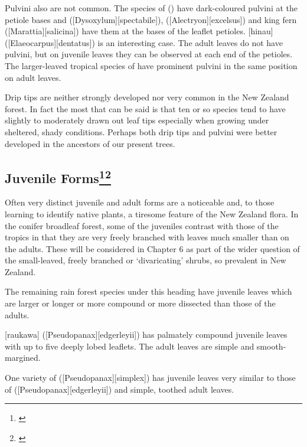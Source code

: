 Pulvini also are not common.
The species of  () have dark-coloured pulvini at the petiole bases and  ([Dysoxylum][spectabile]),  ([Alectryon][excelsus]) and king fern ([Marattia][salicina]) have them at the bases of the leaflet petioles.
[hinau] ([Elaeocarpus][dentatus]) is an interesting case.
The adult leaves do not have pulvini, but on juvenile leaves they can be observed at each end of the petioles.
The larger-leaved tropical species of  have prominent pulvini in the same position on adult leaves.

Drip tips are neither strongly developed nor very common in the New Zealand forest.
In fact the most that can be said is that ten or so species tend to have slightly to moderately drawn out leaf tips especially when growing under sheltered, shady conditions.
Perhaps both drip tips and pulvini were better developed in the ancestors of our present trees.

\subsection[Juvenile Forms]{Juvenile Forms\thinspace\footnote{\cite{godley1985paths}}\footnote{\cite{philipson1964habit}}}

Often very distinct juvenile and adult forms are a noticeable and, to those learning to identify native plants, a tiresome feature of the New Zealand flora.
In the conifer broadleaf forest, some of the juveniles contrast with those of the tropics in that they are very freely branched with leaves much smaller than on the adults.
These will be considered in Chapter 6 as part of the wider question of the small-leaved, freely branched or `divaricating' shrubs, so prevalent in New Zealand.

The remaining rain forest species under this heading have juvenile leaves which are larger or longer or more compound or more dissected than those of the adults.

[raukawa] ([Pseudopanax][edgerleyii]) has palmately compound juvenile leaves with up to five deeply lobed leaflets.
The adult leaves are simple and smooth-margined.

One variety of  ([Pseudopanax][simplex]) has juvenile leaves very similar to those of  ([Pseudopanax][edgerleyii]) and simple, toothed adult leaves.

